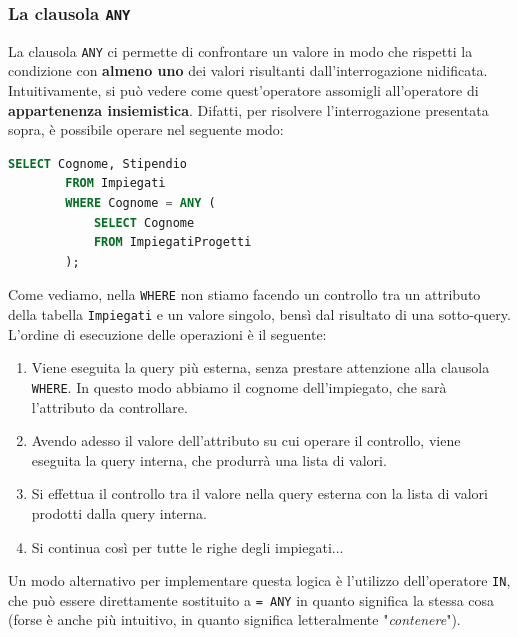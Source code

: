\documentclass[12pt]{report}
\begin{document}
	\subsubsection*{La clausola \texttt{ANY}}
	La clausola \texttt{ANY} ci permette di confrontare un valore in modo che rispetti la condizione con \textbf{almeno uno} dei valori risultanti dall'interrogazione nidificata. Intuitivamente, si può vedere come quest'operatore assomigli all'operatore di \textbf{appartenenza insiemistica}. Difatti, per risolvere l'interrogazione presentata sopra, è possibile operare nel seguente modo:
	\begin{lstlisting}[language=SQL]
		SELECT Cognome, Stipendio
		FROM Impiegati
		WHERE Cognome = ANY (
			SELECT Cognome
			FROM ImpiegatiProgetti
		);
	\end{lstlisting}
	Come vediamo, nella \texttt{WHERE} non stiamo facendo un controllo tra un attributo della tabella \texttt{Impiegati} e un valore singolo, bensì dal risultato di una sotto-query.\\
	L'ordine di esecuzione delle operazioni è il seguente:
	\begin{enumerate}
		\item Viene eseguita la query più esterna, senza prestare attenzione alla clausola \texttt{WHERE}. In questo modo abbiamo il cognome dell'impiegato, che sarà l'attributo da controllare.
		
		\item Avendo adesso il valore dell'attributo su cui operare il controllo, viene eseguita la query interna, che produrrà una lista di valori.
		
		\item Si effettua il controllo tra il valore nella query esterna con la lista di valori prodotti dalla query interna.
		
		\item Si continua così per tutte le righe degli impiegati...
	\end{enumerate}
	Un modo alternativo per implementare questa logica è l'utilizzo dell'operatore \texttt{IN}, che può essere direttamente sostituito a \texttt{= ANY} in quanto significa la stessa cosa (forse è anche più intuitivo, in quanto significa letteralmente "\textit{contenere}").
	
\end{document}
